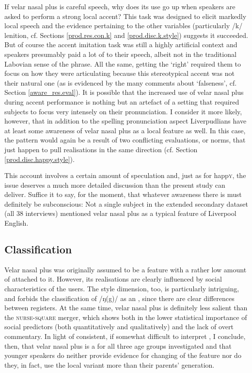 If velar nasal plus is careful speech, why does its use go up when speakers are asked to perform a strong local accent?
This task was designed to elicit markedly local speech and the evidence pertaining to the other variables (particularly /k/ lenition, cf. Sections \ref{prod.res.con.k} and \ref{prod.disc.k.style}) suggests it succeeded.
But of course the accent imitation task was still a highly artificial context and speakers presumably paid a lot of  to their speech, albeit not in the traditional Labovian sense of the phrase.
All the same, getting the  `right' required them to focus on how they were articulating because this stereotypical accent was not their natural one (as is evidenced by the many comments about `falseness', cf. Section \ref{aware_res.eval}).
It is possible that the increased use of velar nasal plus during accent performance is nothing but an artefact of a setting that required subjects to focus very intensely on their pronunciation.
I consider it more likely, however, that in addition to the spelling pronunciation aspect Liverpudlians have at least some awareness of velar nasal plus as a local feature as well.
In this case, the  pattern would again be a result of two conflicting evaluations, or norms, that just happen to pull realisations in the same direction (cf. Section \ref{prod.disc.happy.style}).

This account involves a certain amount of speculation and, just as for happ\textsc{y}, the issue deserves a much more detailed discussion than the present study can deliver.
Suffice it to say, for the moment, that whatever awareness there is must definitely be subconscious: Not a single subject in the extended secondary dataset (all 38 interviews) mentioned velar nasal plus as a typical feature of Liverpool English.

\subsection{Classification}
\label{prod.disc.ng.classification}

Velar nasal plus was originally assumed to be a feature with a rather low amount of  attached to it.
However, its realisations are clearly influenced by social characteristics of the users.
The style dimension, too, is particularly intriguing, and forbids the classification of /ŋ(g)/ as an , since there are clear differences between registers.
At the same time, velar nasal plus is definitely less salient than the \textsc{nurse}-\textsc{square} merger, which shows both in the lower statistical importance of social predictors (both quantitatively and qualitatively) and the lack of overt commentary.
In light of consistent, if somewhat difficult to interpret , I conclude, then, that velar nasal plus is a  for all three age groups investigated and that younger speakers do neither provide evidence for changing  of the feature nor do they, in fact, use the local variant more than their parents' generation.

